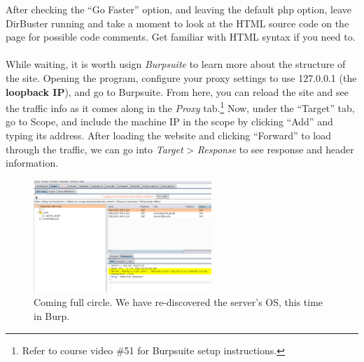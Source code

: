 \documentclass[a4paper,11pt]{article}
\begin{document}
After checking the ``Go Faster'' option, and leaving the default php option, leave DirBuster running and take a moment to look at the HTML source code on the page for possible code comments. Get familiar with HTML syntax if you need to.
\\
\\
While waiting, it is worth usign \textit{Burpsuite} to learn more about the structure of the site. Opening the program, configure your proxy settings to use 127.0.0.1 (the {\bfseries loopback IP}), and go to Burpsuite.
From here, you can reload the site and see the traffic info as it comes along in the \textit{Proxy} tab.\footnote[2]{Refer to course video \#51 for Burpsuite setup instructions.} Now, under the ``Target'' tab, go to Scope, and include the machine IP in the scope by clicking ``Add'' and typing its address. After loading the website and clicking ``Forward'' to load through the traffic, we can go into \textit{Target} > \textit{Response} to see response and header information.

\begin{figure}[h]
    \centering
    \includegraphics[width=0.6\textwidth]{images/burpresponse.png}
    \caption{Coming full circle. We have re-discovered the server's OS, this time in Burp.}
    \label{fig:burpresponse}
\end{figure}
\pagebreak
\end{document}
